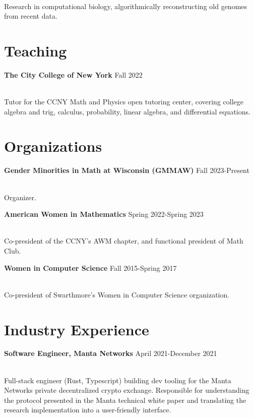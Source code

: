 \documentclass[11pt, reqno]{amsart}
\begin{document}
	 \\ 
	
	{Research in computational biology, algorithmically reconstructing old genomes from recent data.} \\

	\section{Teaching} %
	\newcommand{\job}[3]{
		\begin{raggedleft}
			{\large \textbf{#1}} \hfill {#2}
		\end{raggedleft} \\
		#3
	}
		\job{The City College of New York}{Fall 2022}{Tutor for the CCNY Math and Physics open tutoring center, covering college algebra and trig, calculus, probability, linear algebra, and differential equations.}
	
	\section{Organizations} %
	\newcommand{\org}[3]{
		\begin{raggedleft}{\large \textbf{#1}} \hfill #2 \end{raggedleft}\\ 
		#3
	}
	\org{Gender Minorities in Math at Wisconsin (GMMAW)}{Fall 2023-Present}{Organizer.}

	\org{American Women in Mathematics}{Spring 2022-Spring 2023}{
	Co-president of the CCNY's AWM chapter, and functional president of Math Club.} \\[-1em]
	
	\org{Women in Computer Science}{Fall 2015-Spring 2017}{
		Co-president of Swarthmore's Women in Computer Science organization.
	}

	\section{Industry Experience} %
	
	\job{Software Engineer, Manta Networks}{April 2021-December 2021}{
	Full-stack engineer (Rust, Typescript) building dev tooling for the Manta Networks private decentralized crypto exchange. Responsible for understanding the protocol presented in the Manta technical white paper and translating the research implementation into a user-friendly interface.}
\end{document}
